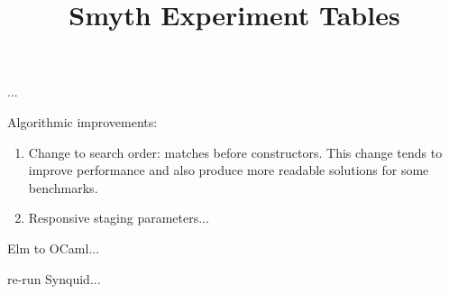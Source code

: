 \documentclass[acmsmall,nonacm]{acmart}
\begin{document}
\title{Smyth Experiment Tables}
\maketitle

...

Algorithmic improvements:

\begin{enumerate}

\item Change to search order: matches before constructors. This change tends to
improve performance and also produce more readable solutions for some
benchmarks.

\item Responsive staging parameters...

\end{enumerate}

Elm to OCaml...

re-run Synquid...

\clearpage

\setcounter{figure}{9}

\setcounter{figure}{0}





\end{document}
